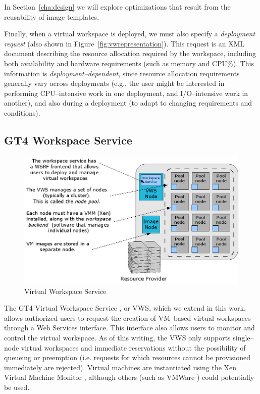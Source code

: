 In Section~\ref{cha:design} we will explore optimizations that result from the reusability of image templates.

Finally, when a virtual workspace is deployed, we must also specify a \emph{deployment request} (also shown in Figure~\ref{fig:vwrepresentation}). This request is an XML document describing the resource
allocation required by the workspace, including both availability and hardware requirements (such as memory and
CPU\%). This information is \emph{deployment--dependent}, since resource allocation requirements generally vary across deployments (e.g., the user might be interested in performing CPU--intensive work in one deployment, and I/O--intensive work in another), and also during a deployment (to adapt to changing requirements and conditions).


\subsection{GT4 Workspace Service}

\begin{figure}
  \begin{center}
    \includegraphics[width=\textwidth]{figures/vw_overview.png}
    \caption{Virtual Workspace Service}
	\label{fig:vwservice}
  \end{center}
\end{figure}


The GT4 Virtual Workspace Service \cite{vwsweb}, or VWS, which we extend in this work, allows authorized users to request the creation of VM--based virtual workspaces through a Web Services interface. This interface also allows users to monitor and control the virtual workspace. As of this writing, the VWS only supports single--node virtual workspaces and immediate reservations without the possibility of queueing or preemption (i.e. requests for which resources cannot be provisioned immediately  are rejected). Virtual machines are instantiated using the Xen Virtual Machine Monitor \cite{xen}, although others (such as VMWare \cite{vmwareweb}) could potentially be used.


